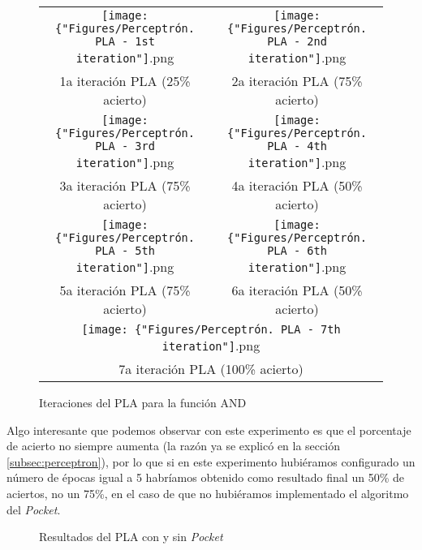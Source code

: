 \begin{figure}
\begin{tabular}{cc}
  \texttt{[image: \{"Figures/Perceptrón. PLA - 1st iteration"]}.png} &  \texttt{[image: \{"Figures/Perceptrón. PLA - 2nd iteration"]}.png} \\
1a iteración PLA (25\% acierto) & 2a iteración PLA (75\% acierto) \\[6pt]
 \texttt{[image: \{"Figures/Perceptrón. PLA - 3rd iteration"]}.png} &   \texttt{[image: \{"Figures/Perceptrón. PLA - 4th iteration"]}.png} \\
3a iteración PLA (75\% acierto) & 4a iteración PLA (50\% acierto) \\[6pt]
\texttt{[image: \{"Figures/Perceptrón. PLA - 5th iteration"]}.png} &   \texttt{[image: \{"Figures/Perceptrón. PLA - 6th iteration"]}.png} \\
5a iteración PLA (75\% acierto) & 6a iteración PLA (50\% acierto) \\[6pt]
\multicolumn{2}{c}{\texttt{[image: \{"Figures/Perceptrón. PLA - 7th iteration"]}.png} }\\
\multicolumn{2}{c}{7a iteración PLA (100\% acierto)}
\end{tabular}
\caption{Iteraciones del PLA para la función AND}
\label{fig:andFunctionPLAIterations}
\end{figure}

\newpage

Algo interesante que podemos observar con este experimento es que el porcentaje de acierto no siempre aumenta (la razón ya se explicó en la sección \ref{subsec:perceptron}), por lo que si en este experimento hubiéramos configurado un número de épocas igual a 5 habríamos obtenido como resultado final un 50\% de aciertos, no un 75\%, en el caso de que no hubiéramos implementado el algoritmo del \textit{Pocket}.

\begin{figure}[!h]
\centering
{}
\caption{Resultados del PLA con y sin \textit{Pocket}}
\label{plot:perceptronResultsWithAndWithoutPocket}
\end{figure}

